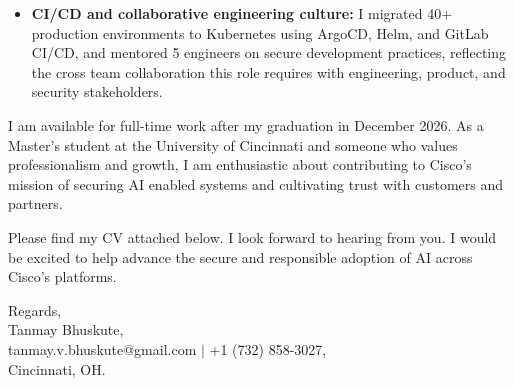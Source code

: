 \documentclass[11pt]{letter}
\begin{document}
\begin{letter}{}
\begin{itemize}[leftmargin=*, itemsep=0.45em]
    \item \textbf{CI/CD and collaborative engineering culture:} I migrated 40+ production environments to Kubernetes using ArgoCD, Helm, and GitLab CI/CD, and mentored 5 engineers on secure development practices, reflecting the cross team collaboration this role requires with engineering, product, and security stakeholders.
\end{itemize}

I am available for full-time work after my graduation in December 2026. As a Master's student at the University of Cincinnati and someone who values professionalism and growth, I am enthusiastic about contributing to Cisco's mission of securing AI enabled systems and cultivating trust with customers and partners.

Please find my CV attached below. I look forward to hearing from you. I would be excited to help advance the secure and responsible adoption of AI across Cisco's platforms.

{\setlength{\parskip}{0pt}
Regards,\\
Tanmay Bhuskute,\\
tanmay.v.bhuskute@gmail.com $\mid$ +1 (732) 858-3027,\\
Cincinnati, OH.
}

\end{letter}
\end{document}
